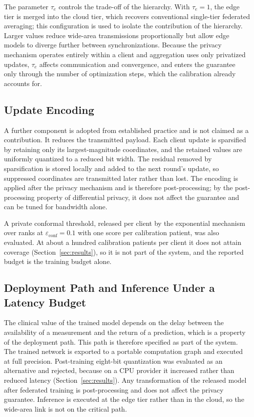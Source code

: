 The parameter $\tau_e$ controls the trade-off of the hierarchy. With
$\tau_e = 1$, the edge tier is merged into the cloud tier, which recovers
conventional single-tier federated averaging; this configuration is used to
isolate the contribution of the hierarchy. Larger values reduce wide-area
transmissions proportionally but allow edge models to diverge further between
synchronizations. Because the privacy mechanism operates entirely within a
client and aggregation uses only privatized updates, $\tau_e$ affects
communication and convergence, and enters the guarantee only through the
number of optimization steps, which the calibration already accounts for.

\subsection{Update Encoding}
\label{sec:method:encoding}

A further component is adopted from established practice and is not claimed
as a contribution. It reduces the transmitted payload. Each
client update is sparsified by retaining only its largest-magnitude
coordinates, and the retained values are uniformly quantized to a reduced bit
width. The residual removed by sparsification is stored locally and added to
the next round's update, so suppressed coordinates are transmitted later rather
than lost. The encoding is applied after the privacy mechanism and is therefore
post-processing; by the post-processing property of differential privacy, it
does not affect the guarantee and can be tuned for bandwidth alone.

A private conformal threshold, released per client by the exponential
mechanism over ranks \cite{ref30, ref24} at $\varepsilon_{\mathrm{conf}} = 0.1$
with one score per calibration patient, was also evaluated. At about a hundred
calibration patients per client it does not attain coverage
(Section~\ref{sec:results}), so it is not part of the system, and the reported
budget is the training budget alone.

\subsection{Deployment Path and Inference Under a Latency Budget}
\label{sec:method:deploy}

The clinical value of the trained model depends on the delay between the
availability of a measurement and the return of a prediction, which is a
property of the deployment path. This path is therefore specified as part of
the system. The trained network is exported to a portable computation graph and executed
at full precision. Post-training eight-bit quantization \cite{ref26} was
evaluated as an alternative and rejected, because on a CPU provider it
increased rather than reduced latency (Section~\ref{sec:results}). Any
transformation of the released model after federated training is
post-processing and does not affect the privacy guarantee. Inference is executed at the edge tier rather
than in the cloud, so the wide-area link is not on the critical path.

